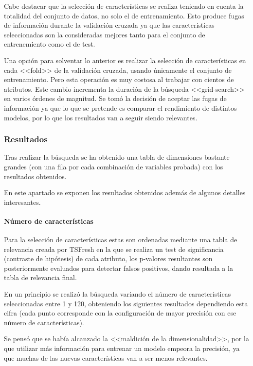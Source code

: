 Cabe destacar que la selección de características se realiza teniendo en cuenta
la totalidad del conjunto de datos, no solo el de entrenamiento. Esto produce
fugas de información durante la validación cruzada ya que las características
seleccionadas son la consideradas mejores tanto para el conjunto de
entrenemiento como el de test.

Una opción para solventar lo anterior es realizar la selección de
características en cada <<fold>> de la validación cruzada, usando únicamente el
conjunto de entrenamiento. Pero esta operación es muy costosa al trabajar con
cientos de atributos. Este cambio incrementa la duración de la búsqueda
<<grid-search>> en varios órdenes de magnitud. Se tomó la decisión de aceptar
las fugas de información ya que lo que se pretende es comparar el rendimiento de
distintos modelos, por lo que los resultados van a seguir siendo relevantes.

\subsubsection{Resultados}

Tras realizar la búsqueda se ha obtenido una tabla de dimensiones bastante
grandes (con una fila por cada combinación de variables probada) con los
resultados obtenidos.

En este apartado se exponen los resultados obtenidos además de algunos detalles
interesantes.

\paragraph{Número de características} Para la selección de características estas
son ordenadas mediante una tabla de relevancia creada por TSFresh en la que se
realiza un test de significancia (contraste de hipótesis) de cada atributo, los
p-valores resultantes son posteriormente evaluados para detectar falsos
positivos, dando resultada a la tabla de relevancia final.

En un principio se realizó la búsqueda
variando el número de características seleccionadas entre 1 y 120, obteniendo
los siguientes resultados dependiendo esta cifra (cada punto corresponde con la
configuración de mayor precisión con ese número de características).


Se pensó que se había alcanzado la <<maldición de la dimensionalidad>>, por la
que utilizar más información para entrenar un modelo empeora la precisión, ya
que muchas de las nuevas características van a ser menos relevantes.

